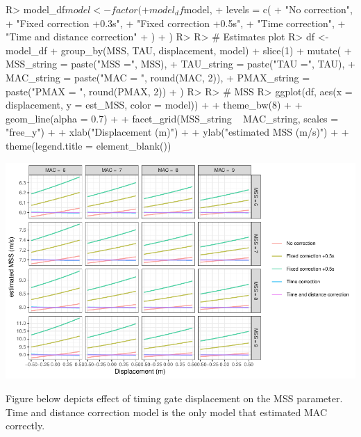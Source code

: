 \documentclass[
]{jss}
\begin{document}
\begin{CodeChunk}
\begin{CodeInput}
R> model_df$model <- factor(
+   model_df$model,
+   levels = c(
+     "No correction",
+     "Fixed correction +0.3s",
+     "Fixed correction +0.5s",
+     "Time correction",
+     "Time and distance correction"
+   )
+ )
R> 
R> # Estimates plot
R> df <- model_df %
+   group_by(MSS, TAU, displacement, model) %
+   slice(1) %
+   mutate(
+     MSS_string = paste("MSS =", MSS),
+     TAU_string = paste("TAU =", TAU),
+     MAC_string = paste("MAC = ", round(MAC, 2)),
+     PMAX_string = paste("PMAX = ", round(PMAX, 2))
+   )
R> 
R> # MSS
R> ggplot(df, aes(x = displacement, y = est_MSS, color = model)) +
+   theme_bw(8) +
+   geom_line(alpha = 0.7) +
+   facet_grid(MSS_string ~ MAC_string, scales = "free_y") +
+   xlab("Displacement (m)") +
+   ylab("estimated MSS (m/s)") +
+   theme(legend.title = element_blank())
\end{CodeInput}


\begin{center}\includegraphics[width=1\linewidth]{paper_files/figure-latex/unnamed-chunk-50-1} \end{center}

\end{CodeChunk}

Figure below depicts effect of timing gate displacement on the MSS parameter. Time and distance correction model is the only model that estimated MAC correctly.
\end{document}
